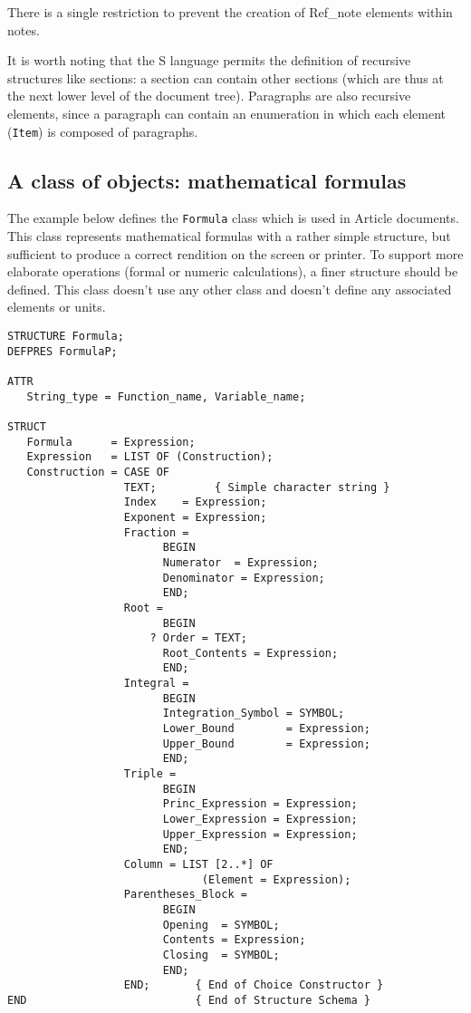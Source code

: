 There is a single restriction to prevent the creation of
Ref\_note elements within notes.

It is worth noting that the S language permits the definition of
recursive structures like sections: a section can contain other
sections (which are thus at the next lower level of the document
tree).  Paragraphs are also recursive elements, since a paragraph can
contain an enumeration in which each element ({\tt Item}) is composed
of paragraphs.

\subsection{A class of objects: mathematical formulas}

The example below defines the {\tt Formula} class which is used in
Article documents.  This class represents mathematical formulas  with
a rather simple structure, but sufficient to produce a correct rendition
on the screen or printer.  To support more elaborate operations
(formal or numeric calculations), a finer structure should be defined.
This class doesn't use any other class and doesn't define any
associated elements or units.

\begin{verbatim}
STRUCTURE Formula;
DEFPRES FormulaP;

ATTR
   String_type = Function_name, Variable_name;

STRUCT
   Formula      = Expression;
   Expression   = LIST OF (Construction);
   Construction = CASE OF
                  TEXT;         { Simple character string }
                  Index    = Expression;
                  Exponent = Expression;
                  Fraction =
                        BEGIN
                        Numerator  = Expression;
                        Denominator = Expression;
                        END;
                  Root = 
                        BEGIN
                      ? Order = TEXT;
                        Root_Contents = Expression;
                        END;
                  Integral =
                        BEGIN
                        Integration_Symbol = SYMBOL;
                        Lower_Bound        = Expression;
                        Upper_Bound        = Expression;
                        END;
                  Triple =
                        BEGIN
                        Princ_Expression = Expression;
                        Lower_Expression = Expression;
                        Upper_Expression = Expression;
                        END;
                  Column = LIST [2..*] OF 
                              (Element = Expression);
                  Parentheses_Block =
                        BEGIN
                        Opening  = SYMBOL;
                        Contents = Expression;
                        Closing  = SYMBOL;
                        END;
                  END;       { End of Choice Constructor }
END                          { End of Structure Schema }
\end{verbatim}

